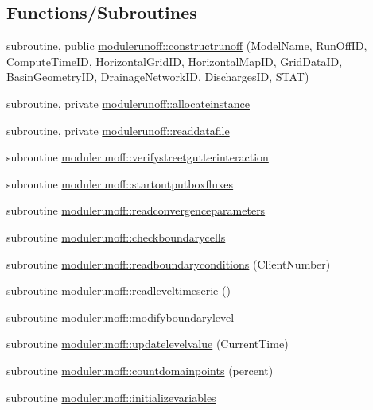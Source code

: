 \subsection*{Functions/\+Subroutines}
\begin{DoxyCompactItemize}
\item 
subroutine, public \mbox{\hyperlink{namespacemodulerunoff_afd5b620864c9f62a5b0258956c609766}{modulerunoff\+::constructrunoff}} (Model\+Name, Run\+Off\+ID, Compute\+Time\+ID, Horizontal\+Grid\+ID, Horizontal\+Map\+ID, Grid\+Data\+ID, Basin\+Geometry\+ID, Drainage\+Network\+ID, Discharges\+ID, S\+T\+AT)
\item 
subroutine, private \mbox{\hyperlink{namespacemodulerunoff_a41e3ad5c7c0c951e239b6f330bf1dfec}{modulerunoff\+::allocateinstance}}
\item 
subroutine, private \mbox{\hyperlink{namespacemodulerunoff_aa5edc73e0e11d57e48fd2c2b7dd60845}{modulerunoff\+::readdatafile}}
\item 
subroutine \mbox{\hyperlink{namespacemodulerunoff_ae19f70ae654f145d09a7ca02839d4f11}{modulerunoff\+::verifystreetgutterinteraction}}
\item 
subroutine \mbox{\hyperlink{namespacemodulerunoff_a94b297f6c1f0a65686f92178ebe5d5c2}{modulerunoff\+::startoutputboxfluxes}}
\item 
subroutine \mbox{\hyperlink{namespacemodulerunoff_a82e45fea3cfee6af75a962d5a7d2224b}{modulerunoff\+::readconvergenceparameters}}
\item 
subroutine \mbox{\hyperlink{namespacemodulerunoff_a56a143bff3b48f116a7cef30352f962e}{modulerunoff\+::checkboundarycells}}
\item 
subroutine \mbox{\hyperlink{namespacemodulerunoff_ad906e87c7318e0ecc61ef60d8121f37c}{modulerunoff\+::readboundaryconditions}} (Client\+Number)
\item 
subroutine \mbox{\hyperlink{namespacemodulerunoff_a16bc6313240379de466a61574c8dbc1d}{modulerunoff\+::readleveltimeserie}} ()
\item 
subroutine \mbox{\hyperlink{namespacemodulerunoff_aac03c1526e1f45dcfe31d200ac141d7e}{modulerunoff\+::modifyboundarylevel}}
\item 
subroutine \mbox{\hyperlink{namespacemodulerunoff_a420154ccf7d67c95702222f4b56fb5fa}{modulerunoff\+::updatelevelvalue}} (Current\+Time)
\item 
subroutine \mbox{\hyperlink{namespacemodulerunoff_a6dee0b7b0f34390926e9ca24de451565}{modulerunoff\+::countdomainpoints}} (percent)
\item 
subroutine \mbox{\hyperlink{namespacemodulerunoff_a99a2963d7ce8cb790b9fa53c6c936329}{modulerunoff\+::initializevariables}}

\end{DoxyCompactItemize}
